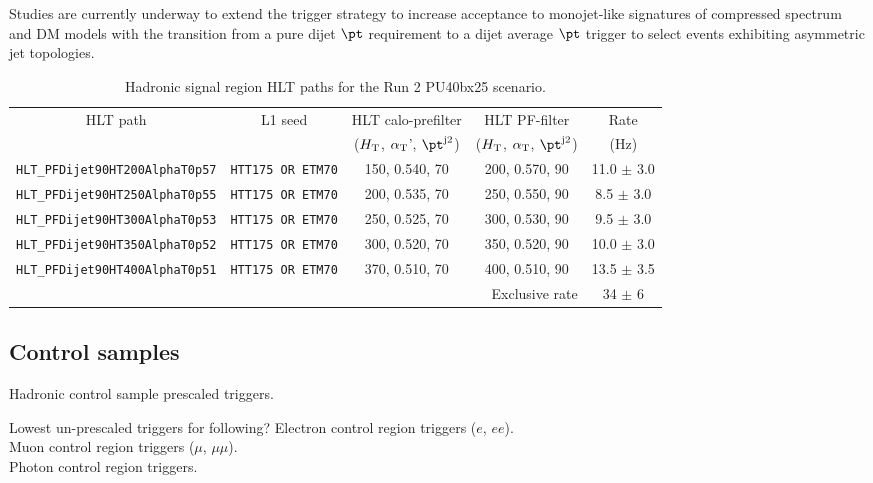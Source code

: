 Studies are currently underway to extend the trigger strategy to increase acceptance to monojet-like signatures of compressed spectrum and DM models with the transition from a pure dijet $\pt$ requirement to a dijet average $\pt$ trigger to select events exhibiting asymmetric jet topologies.




\begin{table}[h!]
\footnotesize
\centering
\begin{tabular}{|c||c|c|c||c|} 
\hline
HLT path & L1 seed & HLT calo-prefilter                      & HLT PF-filter                          & Rate \\[0.7 ex] 
         &         & ($\mbox{$H_\text{T}$}$, $\alpha_{\text{T}}$', $\pt^{\rm j2}$) & ($\mbox{$H_\text{T}$}$, $\alpha_{\text{T}}$, $\pt^{\rm j2}$) & (Hz) \\[0.7 ex] 
\hline
\verb!HLT_PFDijet90HT200AlphaT0p57! & \verb!HTT175 OR ETM70! & 150, 0.540, 70 & 200, 0.570, 90 & 11.0 $\pm$ 3.0 \\
\verb!HLT_PFDijet90HT250AlphaT0p55! & \verb!HTT175 OR ETM70! & 200, 0.535, 70 & 250, 0.550, 90 & 8.5  $\pm$ 3.0 \\
\verb!HLT_PFDijet90HT300AlphaT0p53! & \verb!HTT175 OR ETM70! & 250, 0.525, 70 & 300, 0.530, 90 & 9.5  $\pm$ 3.0 \\
\verb!HLT_PFDijet90HT350AlphaT0p52! & \verb!HTT175 OR ETM70! & 300, 0.520, 70 & 350, 0.520, 90 & 10.0 $\pm$ 3.0 \\
\verb!HLT_PFDijet90HT400AlphaT0p51! & \verb!HTT175 OR ETM70! & 370, 0.510, 70 & 400, 0.510, 90 & 13.5 $\pm$ 3.5 \\
\hline
\multicolumn{4}{|r||}{Exclusive rate} & 34 $\pm$ 6 \\
\hline


\end{tabular}
\caption{Hadronic signal region HLT paths for the Run 2 PU40bx25 scenario. }
\label{tab:2015_Hadronic_Triggers}
\end{table}




\subsection{Control samples}
Hadronic control sample prescaled triggers.

Lowest un-prescaled triggers for following?
Electron control region triggers ($e$, $ee$). \\
Muon control region triggers ($\mu$, $\mu\mu$).\\
Photon control region triggers.\\




